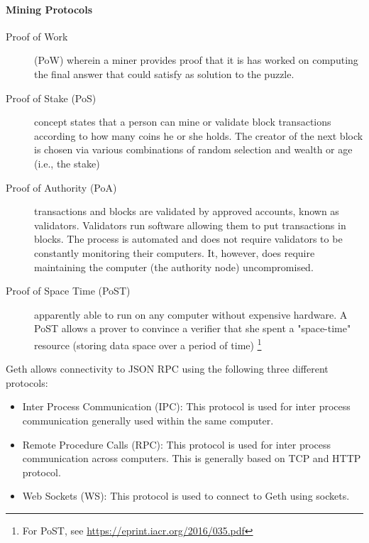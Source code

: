 \paragraph{Mining Protocols}
\begin{description}
\item[Proof of Work] (PoW) wherein a miner provides proof that it is has worked on computing the final answer that could satisfy as solution to the puzzle.

\item[Proof of Stake (PoS)] concept states that a person can mine or validate block transactions according to how many coins he or she holds. The creator of the next block is chosen via various combinations of random selection and wealth or age (i.e., the stake)

\item[Proof of Authority (PoA)]  transactions and blocks are validated by approved accounts, known as validators. Validators run software allowing them to put transactions in blocks. The process is automated and does not require validators to be constantly monitoring their computers. It, however, does require maintaining the computer (the authority node) uncompromised.

\item[Proof of Space Time (PoST)] apparently able to run on any computer without expensive hardware. A PoST allows a prover to convince a verifier that she spent a "space-time" resource (storing data space over a period of time) \footnote{For PoST, see \url{https://eprint.iacr.org/2016/035.pdf}}
\end{description}

 Geth allows connectivity to JSON RPC using the following three different protocols:
\begin{itemize}
\item Inter Process Communication (IPC):  This protocol is used for inter process communication generally used within the same computer.
\item Remote Procedure Calls (RPC):  This protocol is used for inter process communication across computers. This is generally based on TCP and HTTP protocol.
\item Web Sockets (WS): This protocol is used to connect to Geth using sockets.
\end{itemize}

